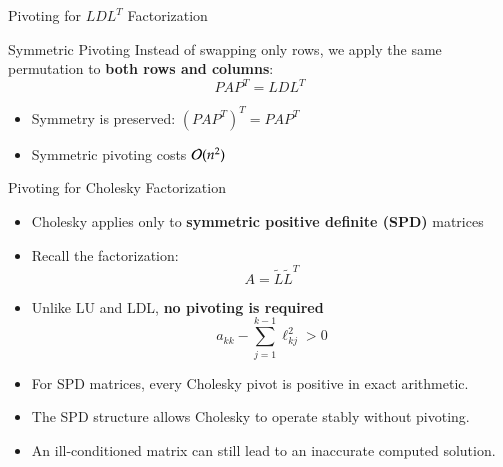 \documentclass[10pt]{beamer}
\begin{document}

\begin{frame}{Pivoting for $LDL^{T}$ Factorization}

{
}

\begin{block}{Symmetric Pivoting}
Instead of swapping only rows, we apply the same permutation to
\textbf{both rows and columns}:
\[
P A P^{T} = L D L^{T}
\]
\end{block}

\begin{itemize}
    \item Symmetry is preserved: $(PAP^{T})^T = PAP^{T}$
    \item Symmetric pivoting costs ${\mathcal{O}}(n^2)$
\end{itemize}

\end{frame}


\begin{frame}{Pivoting for Cholesky Factorization}

\begin{itemize}
    \item Cholesky applies only to \textbf{symmetric positive definite (SPD)} matrices
    \item Recall the factorization:
    \[
        A = \tilde{L}\tilde{L}^T
    \]
    \item Unlike LU and LDL, \textbf{no pivoting is required}
    \[
        a_{kk} - \sum_{j=1}^{k-1} \ell_{kj}^2 > 0
    \]
\item For SPD matrices, every Cholesky pivot is positive
in exact arithmetic.

\item The SPD structure allows Cholesky to operate stably
without pivoting.

\item An ill-conditioned matrix can still lead to an
inaccurate computed solution.
    
\end{itemize}

\end{frame}
\end{document}
